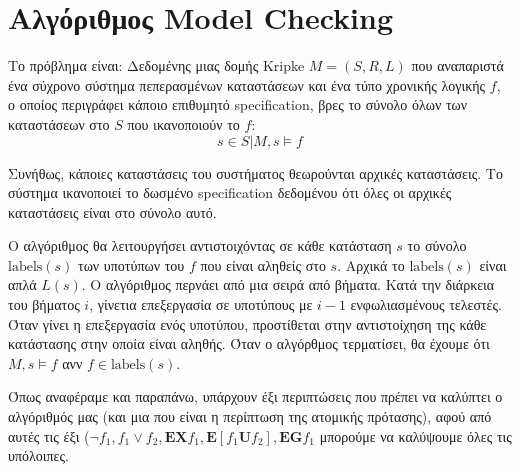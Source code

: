 \documentclass{article}
\newcommand{\english}[1]{\foreignlanguage{english}{{#1}}}
\begin{document}
\section*{Αλγόριθμος \english{Model Checking}}

Το πρόβλημα είναι: Δεδομένης μιας δομής \english{Kripke} $M = (S, R, L)$ που αναπαριστά ένα σύχρονο σύστημα πεπερασμένων καταστάσεων και ένα τύπο χρονικής λογικής $f$, ο οποίος περιγράφει κάποιο επιθυμητό \english{specification}, βρες το σύνολο όλων των καταστάσεων στο $S$ που ικανοποιούν το $f$:
\begin{equation*}
    {s \in S | M, s \models f}
\end{equation*}

Συνήθως, κάποιες καταστάσεις του συστήματος θεωρούνται αρχικές καταστάσεις. Το σύστημα ικανοποιεί το δωσμένο \english{specification} δεδομένου ότι όλες οι αρχικές καταστάσεις είναι στο σύνολο αυτό.

Ο αλγόριθμος θα λειτουργήσει αντιστοιχόντας σε κάθε κατάσταση $s$ το σύνολο \english{$\text{labels}(s)$} των υποτύπων του $f$ που είναι αληθείς στο $s$. Αρχικά το \english{$\text{labels}(s)$} είναι απλά $L(s)$. Ο αλγόριθμος περνάει από μια σειρά από βήματα. Κατά την διάρκεια του βήματος $i$, γίνετια επεξεργασία σε υποτύπους με $i - 1$ ενφωλιασμένους τελεστές. Όταν γίνει η επεξεργασία ενός υποτύπου, προστίθεται στην αντιστοίχηση της κάθε κατάστασης στην οποία είναι αληθής. Όταν ο αλγόρθμος τερματίσει, θα έχουμε ότι $M, s \models f$ ανν \english{$f \in \text{labels}(s)$}.

Όπως αναφέραμε και παραπάνω, υπάρχουν έξι περιπτώσεις που πρέπει να καλύπτει ο αλγόριθμός μας (και μια που είναι η περίπτωση της ατομικής πρότασης), αφού από αυτές τις έξι ($\neg f_1, f_1 \vee f_2, \mathbf{EX} f_1, \mathbf{E}[f_1 \mathbf{U} f_2], \mathbf{EG} f_1$ μπορούμε να καλύψουμε όλες τις υπόλοιπες.
\end{document}

